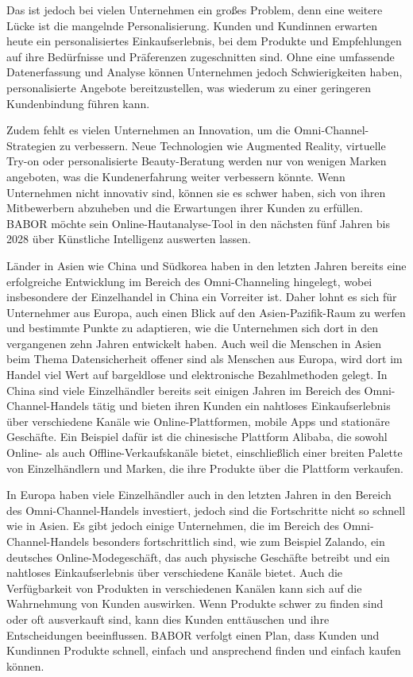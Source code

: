 Das ist jedoch bei vielen Unternehmen ein großes Problem, denn eine weitere Lücke ist die mangelnde Personalisierung. Kunden und Kundinnen erwarten heute ein personalisiertes Einkaufserlebnis, bei dem Produkte und Empfehlungen auf ihre Bedürfnisse und Präferenzen zugeschnitten sind. Ohne eine umfassende Datenerfassung und Analyse können Unternehmen jedoch Schwierigkeiten haben, personalisierte Angebote bereitzustellen, was wiederum zu einer geringeren Kundenbindung führen kann.
\newline

Zudem fehlt es vielen Unternehmen an Innovation, um die Omni-Channel-Strategien zu verbessern. Neue Technologien wie Augmented Reality, virtuelle Try-on oder personalisierte Beauty-Beratung werden nur von wenigen Marken angeboten, was die Kundenerfahrung weiter verbessern könnte. Wenn Unternehmen nicht innovativ sind, können sie es schwer haben, sich von ihren Mitbewerbern abzuheben und die Erwartungen ihrer Kunden zu erfüllen. BABOR möchte sein Online-Hautanalyse-Tool in den nächsten fünf Jahren bis 2028 über Künstliche Intelligenz auswerten lassen.
\newline

Länder in Asien wie China und Südkorea haben in den letzten Jahren bereits eine erfolgreiche Entwicklung im Bereich des Omni-Channeling hingelegt, wobei insbesondere der Einzelhandel in China ein Vorreiter ist. Daher lohnt es sich für Unternehmer aus Europa, auch einen Blick auf den Asien-Pazifik-Raum zu werfen und bestimmte Punkte zu adaptieren, wie die Unternehmen sich dort in den vergangenen zehn Jahren entwickelt haben. Auch weil die Menschen in Asien beim Thema Datensicherheit offener sind als Menschen aus Europa, wird dort im Handel viel Wert auf bargeldlose und elektronische Bezahlmethoden gelegt. In China sind viele Einzelhändler bereits seit einigen Jahren im Bereich des Omni-Channel-Handels tätig und bieten ihren Kunden ein nahtloses Einkaufserlebnis über verschiedene Kanäle wie Online-Plattformen, mobile Apps und stationäre Geschäfte. Ein Beispiel dafür ist die chinesische Plattform Alibaba, die sowohl Online- als auch Offline-Verkaufskanäle bietet, einschließlich einer breiten Palette von Einzelhändlern und Marken, die ihre Produkte über die Plattform verkaufen.
\newline

In Europa haben viele Einzelhändler auch in den letzten Jahren in den Bereich des Omni-Channel-Handels investiert, jedoch sind die Fortschritte nicht so schnell wie in Asien. Es gibt jedoch einige Unternehmen, die im Bereich des Omni-Channel-Handels besonders fortschrittlich sind, wie zum Beispiel Zalando, ein deutsches Online-Modegeschäft, das auch physische Geschäfte betreibt und ein nahtloses Einkaufserlebnis über verschiedene Kanäle bietet. Auch die Verfügbarkeit von Produkten in verschiedenen Kanälen kann sich auf die Wahrnehmung von Kunden auswirken. Wenn Produkte schwer zu finden sind oder oft ausverkauft sind, kann dies Kunden enttäuschen und ihre Entscheidungen beeinflussen. BABOR verfolgt einen Plan, dass Kunden und Kundinnen Produkte schnell, einfach und ansprechend finden und einfach kaufen können.
